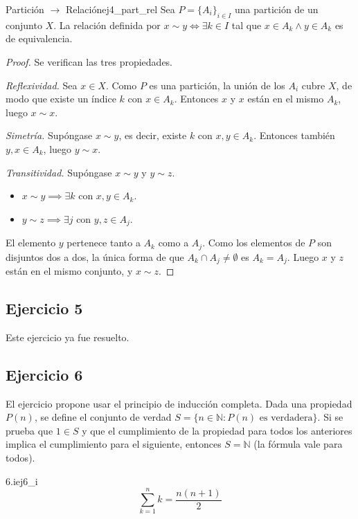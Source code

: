 \documentclass[11pt, a4paper]{article}
\begin{document}
\begin{proposicion}{Partición $\to$ Relación}{ej4_part_rel}
Sea $P = \{A_i\}_{i \in I}$ una partición de un conjunto $X$.
La relación definida por $x \sim y \iff \exists k \in I$ tal que $x \in A_k \land y \in A_k$ es de
equivalencia.
\end{proposicion}

\begin{proof}
Se verifican las tres propiedades.

\textit{Reflexividad.} Sea $x \in X$. Como $P$ es una partición, la unión de los $A_i$ cubre $X$, de modo
que existe un índice $k$ con $x \in A_k$. Entonces $x$ y $x$ están en el mismo $A_k$, luego
$x \sim x$.

\textit{Simetría.} Supóngase $x \sim y$, es decir, existe $k$ con $x, y \in A_k$. Entonces también
$y, x \in A_k$, luego $y \sim x$.

\textit{Transitividad.} Supóngase $x \sim y$ y $y \sim z$.
\begin{itemize}
    \item $x \sim y \implies \exists k$ con $x, y \in A_k$.
    \item $y \sim z \implies \exists j$ con $y, z \in A_j$.
\end{itemize}
El elemento $y$ pertenece tanto a $A_k$ como a $A_j$. Como los elementos de $P$ son disjuntos dos a
dos, la única forma de que $A_k \cap A_j \neq \emptyset$ es $A_k = A_j$. Luego $x$ y $z$ están en el
mismo conjunto, y $x \sim z$.
\end{proof}

\subsection*{Ejercicio 5}

Este ejercicio ya fue resuelto.

\subsection*{Ejercicio 6}

El ejercicio propone usar el principio de inducción completa.
Dada una propiedad $P(n)$, se define el conjunto de verdad
$S = \{n \in \mathbb{N} : P(n) \text{ es verdadera}\}$.
Si se prueba que $1 \in S$ y que el cumplimiento de la propiedad para todos los anteriores implica el
cumplimiento para el siguiente, entonces $S = \mathbb{N}$ (la fórmula vale para todos).

\begin{proposicion}{6.i}{ej6_i}
$$ \sum_{k=1}^{n}k=\frac{n(n+1)}{2} $$
\end{proposicion}
\end{document}
